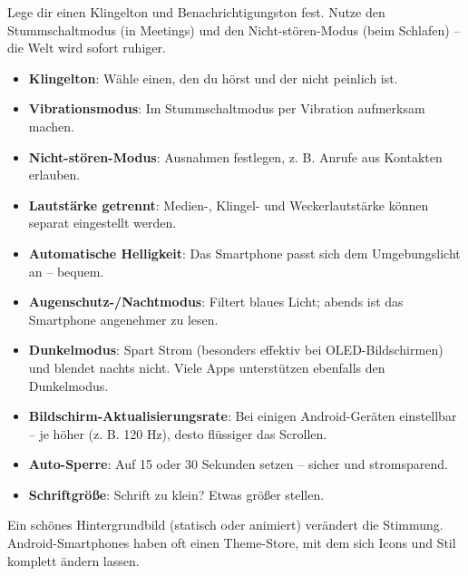 


Lege dir einen Klingelton und Benachrichtigungston fest. Nutze den Stummschaltmodus (in Meetings) und den Nicht-stören-Modus (beim Schlafen) – die Welt wird sofort ruhiger.

\begin{itemize}
  \item \textbf{Klingelton}: Wähle einen, den du hörst und der nicht peinlich ist.
  \item \textbf{Vibrationsmodus}: Im Stummschaltmodus per Vibration aufmerksam machen.
  \item \textbf{Nicht-stören-Modus}: Ausnahmen festlegen, z. B. Anrufe aus Kontakten erlauben.
  \item \textbf{Lautstärke getrennt}: Medien-, Klingel- und Weckerlautstärke können separat eingestellt werden.
\end{itemize}


\begin{itemize}
  \item \textbf{Automatische Helligkeit}: Das Smartphone passt sich dem Umgebungslicht an – bequem.
  \item \textbf{Augenschutz-/Nachtmodus}: Filtert blaues Licht; abends ist das Smartphone angenehmer zu lesen.
  \item \textbf{Dunkelmodus}: Spart Strom (besonders effektiv bei OLED-Bildschirmen) und blendet nachts nicht. Viele Apps unterstützen ebenfalls den Dunkelmodus.
  \item \textbf{Bildschirm-Aktualisierungsrate}: Bei einigen Android-Geräten einstellbar – je höher (z. B. 120 Hz), desto flüssiger das Scrollen.
  \item \textbf{Auto-Sperre}: Auf 15 oder 30 Sekunden setzen – sicher und stromsparend.
  \item \textbf{Schriftgröße}: Schrift zu klein? Etwas größer stellen.
\end{itemize}


Ein schönes Hintergrundbild (statisch oder animiert) verändert die Stimmung. Android-Smartphones haben oft einen Theme-Store, mit dem sich Icons und Stil komplett ändern lassen.

